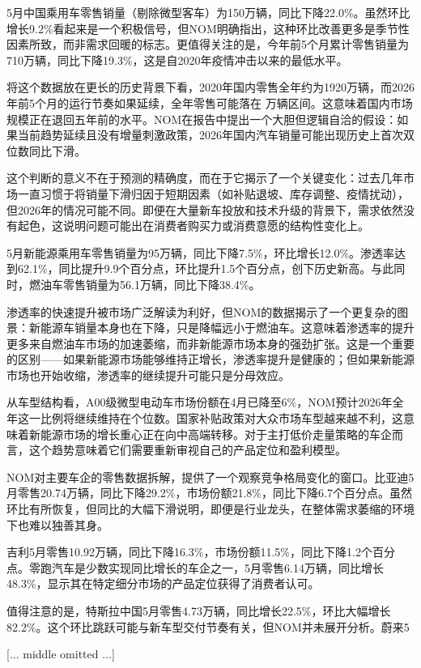 \documentclass[11pt]{ctexart}
\begin{document}
5月中国乘用车零售销量（剔除微型客车）为150万辆，同比下降22.0\%。虽然环比增长9.2\%看起来是一个积极信号，但NOM明确指出，这种环比改善更多是季节性因素所致，而非需求回暖的标志。更值得关注的是，今年前5个月累计零售销量为710万辆，同比下降19.3\%，这是自2020年疫情冲击以来的最低水平。

将这个数据放在更长的历史背景下看，2020年国内零售全年约为1920万辆，而2026年前5个月的运行节奏如果延续，全年零售可能落在 万辆区间。这意味着国内市场规模正在退回五年前的水平。NOM在报告中提出一个大胆但逻辑自洽的假设：如果当前趋势延续且没有增量刺激政策，2026年国内汽车销量可能出现历史上首次双位数同比下滑。

这个判断的意义不在于预测的精确度，而在于它揭示了一个关键变化：过去几年市场一直习惯于将销量下滑归因于短期因素（如补贴退坡、库存调整、疫情扰动），但2026年的情况可能不同。即便在大量新车投放和技术升级的背景下，需求依然没有起色，这说明问题可能出在消费者购买力或消费意愿的结构性变化上。

5月新能源乘用车零售销量为95万辆，同比下降7.5\%，环比增长12.0\%。渗透率达到62.1\%，同比提升9.9个百分点，环比提升1.5个百分点，创下历史新高。与此同时，燃油车零售销量为56.1万辆，同比下降38.4\%。

渗透率的快速提升被市场广泛解读为利好，但NOM的数据揭示了一个更复杂的图景：新能源车销量本身也在下降，只是降幅远小于燃油车。这意味着渗透率的提升更多来自燃油车市场的加速萎缩，而非新能源市场本身的强劲扩张。这是一个重要的区别——如果新能源市场能够维持正增长，渗透率提升是健康的；但如果新能源市场也开始收缩，渗透率的继续提升可能只是分母效应。

从车型结构看，A00级微型电动车市场份额在4月已降至6\%，NOM预计2026年全年这一比例将继续维持在个位数。国家补贴政策对大众市场车型越来越不利，这意味着新能源市场的增长重心正在向中高端转移。对于主打低价走量策略的车企而言，这个趋势意味着它们需要重新审视自己的产品定位和盈利模型。

NOM对主要车企的零售数据拆解，提供了一个观察竞争格局变化的窗口。比亚迪5月零售20.74万辆，同比下降29.2\%，市场份额21.8\%，同比下降6.7个百分点。虽然环比有所恢复，但同比的大幅下滑说明，即便是行业龙头，在整体需求萎缩的环境下也难以独善其身。

吉利5月零售10.92万辆，同比下降16.3\%，市场份额11.5\%，同比下降1.2个百分点。零跑汽车是少数实现同比增长的车企之一，5月零售6.14万辆，同比增长48.3\%，显示其在特定细分市场的产品定位获得了消费者认可。

值得注意的是，特斯拉中国5月零售4.73万辆，同比增长22.5\%，环比大幅增长82.2\%。这个环比跳跃可能与新车型交付节奏有关，但NOM并未展开分析。蔚来5

[... middle omitted ...]
\end{document}
